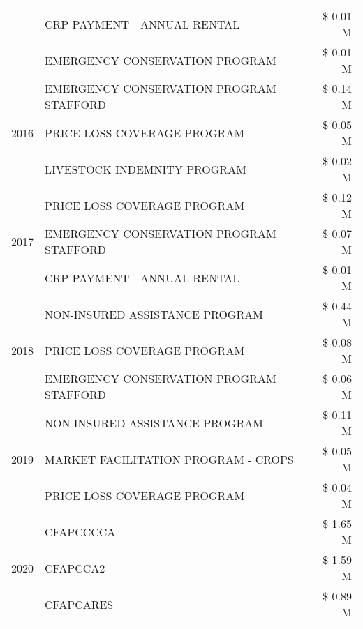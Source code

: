 \begin{tabular}{llr}
 & CRP PAYMENT - ANNUAL RENTAL & \$ 0.01 M \\
 & EMERGENCY CONSERVATION PROGRAM & \$ 0.01 M \\
\cline{1-3}
\multirow[t]{3}{*}{2016} & EMERGENCY CONSERVATION PROGRAM STAFFORD & \$ 0.14 M \\
 & PRICE LOSS COVERAGE PROGRAM & \$ 0.05 M \\
 & LIVESTOCK INDEMNITY PROGRAM & \$ 0.02 M \\
\cline{1-3}
\multirow[t]{3}{*}{2017} & PRICE LOSS COVERAGE PROGRAM & \$ 0.12 M \\
 & EMERGENCY CONSERVATION PROGRAM STAFFORD & \$ 0.07 M \\
 & CRP PAYMENT - ANNUAL RENTAL & \$ 0.01 M \\
\cline{1-3}
\multirow[t]{3}{*}{2018} & NON-INSURED ASSISTANCE PROGRAM & \$ 0.44 M \\
 & PRICE LOSS COVERAGE PROGRAM & \$ 0.08 M \\
 & EMERGENCY CONSERVATION PROGRAM STAFFORD & \$ 0.06 M \\
\cline{1-3}
\multirow[t]{3}{*}{2019} & NON-INSURED ASSISTANCE PROGRAM & \$ 0.11 M \\
 & MARKET FACILITATION PROGRAM - CROPS & \$ 0.05 M \\
 & PRICE LOSS COVERAGE PROGRAM & \$ 0.04 M \\
\cline{1-3}
\multirow[t]{3}{*}{2020} & CFAPCCCCA & \$ 1.65 M \\
 & CFAPCCA2 & \$ 1.59 M \\
 & CFAPCARES & \$ 0.89 M \\
\cline{1-3}
\bottomrule
\end{tabular}
